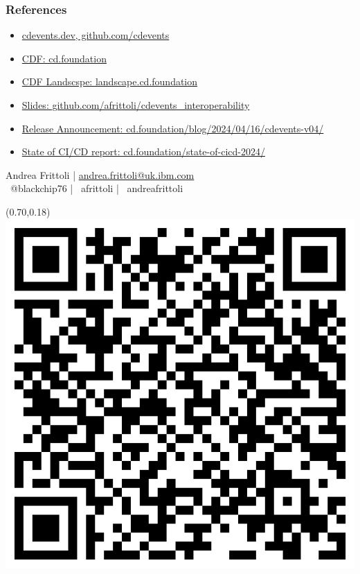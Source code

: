\documentclass[aspectratio=169,11pt,hyperref={colorlinks=true}]{beamer}
\begin{document}
\begin{blackframe}
  \frametitle{References}
  \begin{itemize}
    \item \href{https://cdevents.dev}{cdevents.dev, github.com/cdevents}
    \item \href{https://cd.foundation}{CDF: cd.foundation}
    \item \href{https://landscape.cd.foundation}{CDF Landscspe: landscape.cd.foundation}
    \item \href{https://github.com/afrittoli/cdevents_interoperability}{Slides: github.com/afrittoli/cdevents\_interoperability}
  \end{itemize}
  \vspace{0.02\textheight}
  \begin{itemize}
    \item \href{https://cd.foundation/blog/2024/04/16/cdevents-v04/}{Release Announcement: cd.foundation/blog/2024/04/16/cdevents-v04/}
    \item \href{https://cd.foundation/state-of-cicd-2024/}{State of CI/CD report: cd.foundation/state-of-cicd-2024/}
  \end{itemize}
  \vspace{0.1\textheight}
  Andrea Frittoli | \href{mailto:andrea.frittoli@uk.ibm.com}{andrea.frittoli@uk.ibm.com} \\
  \faTwitter ~@blackchip76 | \faGithub ~afrittoli | \faLinkedin ~andreafrittoli
  \begin{textblock*}{0.15\paperwidth}(0.70\paperwidth,0.18\paperheight)
    \includegraphics[width=0.15\paperwidth]{img/cdcon2024-slides.png}
  \end{textblock*}
\end{blackframe}
\end{document}
